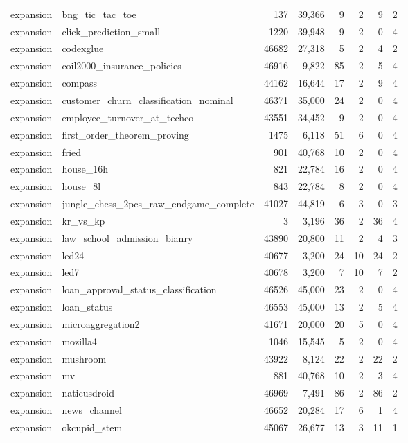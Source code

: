 \begin{longtable}{llrrrrrc}
expansion & bng\_tic\_tac\_toe & 137 & 39{,}366 & 9 & 2 & 9 & 2 \\
expansion & click\_prediction\_small & 1220 & 39{,}948 & 9 & 2 & 0 & 4 \\
expansion & codexglue & 46682 & 27{,}318 & 5 & 2 & 4 & 2 \\
expansion & coil2000\_insurance\_policies & 46916 & 9{,}822 & 85 & 2 & 5 & 4 \\
expansion & compass & 44162 & 16{,}644 & 17 & 2 & 9 & 4 \\
expansion & customer\_churn\_classification\_nominal & 46371 & 35{,}000 & 24 & 2 & 0 & 4 \\
expansion & employee\_turnover\_at\_techco & 43551 & 34{,}452 & 9 & 2 & 0 & 4 \\
expansion & first\_order\_theorem\_proving & 1475 & 6{,}118 & 51 & 6 & 0 & 4 \\
expansion & fried & 901 & 40{,}768 & 10 & 2 & 0 & 4 \\
expansion & house\_16h & 821 & 22{,}784 & 16 & 2 & 0 & 4 \\
expansion & house\_8l & 843 & 22{,}784 & 8 & 2 & 0 & 4 \\
expansion & jungle\_chess\_2pcs\_raw\_endgame\_complete & 41027 & 44{,}819 & 6 & 3 & 0 & 3 \\
expansion & kr\_vs\_kp & 3 & 3{,}196 & 36 & 2 & 36 & 4 \\
expansion & law\_school\_admission\_bianry & 43890 & 20{,}800 & 11 & 2 & 4 & 3 \\
expansion & led24 & 40677 & 3{,}200 & 24 & 10 & 24 & 2 \\
expansion & led7 & 40678 & 3{,}200 & 7 & 10 & 7 & 2 \\
expansion & loan\_approval\_status\_classification & 46526 & 45{,}000 & 23 & 2 & 0 & 4 \\
expansion & loan\_status & 46553 & 45{,}000 & 13 & 2 & 5 & 4 \\
expansion & microaggregation2 & 41671 & 20{,}000 & 20 & 5 & 0 & 4 \\
expansion & mozilla4 & 1046 & 15{,}545 & 5 & 2 & 0 & 4 \\
expansion & mushroom & 43922 & 8{,}124 & 22 & 2 & 22 & 2 \\
expansion & mv & 881 & 40{,}768 & 10 & 2 & 3 & 4 \\
expansion & naticusdroid & 46969 & 7{,}491 & 86 & 2 & 86 & 2 \\
expansion & news\_channel & 46652 & 20{,}284 & 17 & 6 & 1 & 4 \\
expansion & okcupid\_stem & 45067 & 26{,}677 & 13 & 3 & 11 & 1 \\

\end{longtable}
